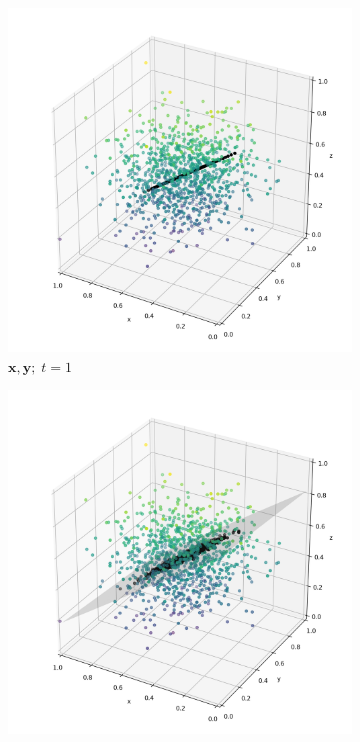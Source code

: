 \documentclass[12pt, aspectratio=169]{beamer}
\newcommand{\xx}{\mathbf{x}}
\newcommand{\yy}{\mathbf{y}}
\begin{document}
\begin{frame}
	\begin{figure}[H]
		\centering
		\begin{subfigure}{0.2\textwidth}
			\includegraphics[width=\linewidth]{resources/X_Y_1_simulated.png}
			\caption{$\xx, \yy; \; t=1$}
			\label{fig:1}
		\end{subfigure}\hfil
		\begin{subfigure}{0.2\textwidth}
			\includegraphics[width=\linewidth]{resources/X_Y_2_simulated.png}

\end{subfigure}
\end{figure}
\end{frame}
\end{document}
